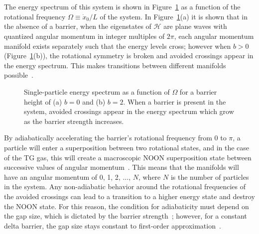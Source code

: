 The energy spectrum of this system is shown in Figure~\ref{fig:avoid} as a function of the rotational frequency $\Omega \equiv \dot x_0 /L$ of the system.
In Figure~\ref{fig:avoid}(a) it is shown that in the absence of a barrier, when the eigenstates of $\mathcal{\hat H}$ are plane waves with quantized angular momentum in integer multiples of $2 \pi$, each angular momentum manifold exists separately such that the energy levels cross; however when $b>0$ (Figure~\ref{fig:avoid}(b)), the rotational symmetry is broken and avoided crossings appear in the energy spectrum.
This makes transitions between different manifolds possible~\cite{schenke2012}.

\begin{figure}

 \centering

\caption{Single-particle energy spectrum as a function of $\Omega$ for a barrier height of (a) $b = 0$ and (b) $b=2$.
When a barrier is present in the system, avoided crossings appear in the energy spectrum which grow as the barrier strength increases.}
\label{fig:avoid}
\end{figure}

By adiabatically accelerating the barrier's rotational frequency from 0 to $\pi$, a particle will enter a superposition between two rotational states, and in the case of the TG gas, this will create a macroscopic NOON superposition state between successive values of angular momentum~\cite{hallwood2010}.
This means that the manifolds will have an angular momentum of 0, 1, 2, $\ldots$, $N$, where $N$ is the number of particles in the system.
Any non-adiabatic behavior around the rotational frequencies of the avoided crossings can lead to a transition to a higher energy state and destroy the NOON state.
For this reason, the condition for adiabaticity must depend on the gap size, which is dictated by the barrier strength~\cite{nunnenkamp2008}; however, for a constant delta barrier, the gap size stays constant to first-order approximation~\cite{hallwood2007}.

